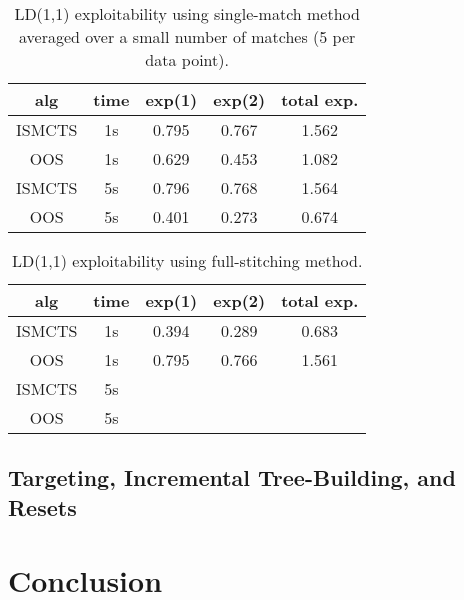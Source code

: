 \documentclass[letterpaper]{article}
\newcommand{\tth}{\mathtt{h}}
\begin{document}
\begin{table}
\begin{center}
\begin{tabular}{ccccc}
alg & time & exp(1) & exp(2) & total exp.\\
\hline
ISMCTS & 1s & 0.795 & 0.767 & 1.562 \\
OOS    & 1s & 0.629 & 0.453 & 1.082 \\
\hline
ISMCTS & 5s & 0.796 & 0.768 & 1.564 \\
OOS    & 5s & 0.401 & 0.273 & 0.674 \\
\end{tabular}
\caption{LD(1,1) exploitability using single-match method averaged over a small number of matches (5 per data point).}
\end{center}
\end{table}

%
% 

\begin{table}
\begin{center}
\begin{tabular}{ccccc}
alg & time & exp(1) & exp(2) & total exp.\\
\hline
ISMCTS & 1s & 0.394 & 0.289 & 0.683 \\
OOS    & 1s & 0.795 & 0.766 & 1.561 \\
\hline
ISMCTS & 5s &  &  &  \\
OOS    & 5s &  &  &  \\
\end{tabular}
\caption{LD(1,1) exploitability using full-stitching method.}
\end{center}
\end{table}

\subsection{Targeting, Incremental Tree-Building, and Resets}





\section{Conclusion}





\end{document}
